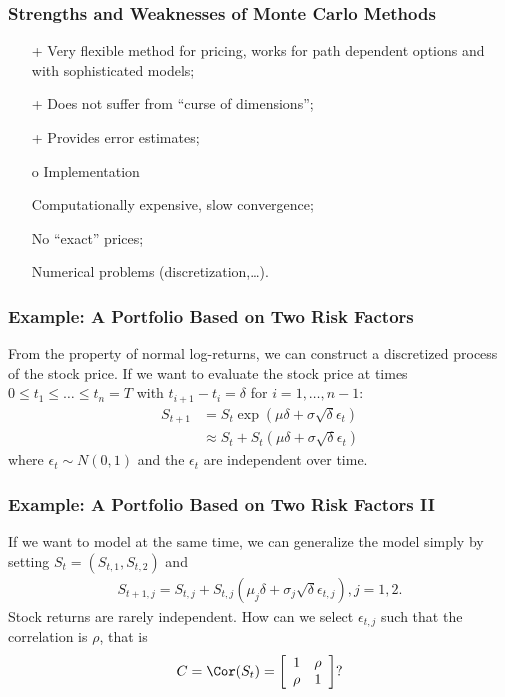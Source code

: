 \begin{frame}[fragile]
\frametitle{Strengths and Weaknesses of Monte Carlo Methods}
\begin{itemize}
  \item[+] Very flexible method for pricing, works for path dependent options
  and with sophisticated models;
  \item[+] Does not suffer from ``curse of dimensions'';
  \item[+] Provides error estimates;
  \item[o\hspace{1px}] Implementation
  \item[\textendash\hspace{1px}] Computationally expensive, slow convergence;
  \item[\textendash\hspace{1px}] No ``exact'' prices;
  \item[\textendash\hspace{1px}] Numerical problems (discretization,\ldots).
\end{itemize}
\end{frame}







\begin{frame}[fragile]
\frametitle{Example: A Portfolio Based on Two Risk Factors}
From the property of normal log-returns, we can construct a discretized process
of the stock price. If we want to evaluate the stock price at times $0 \leq t_1
\leq \ldots \leq t_n=T$ with $t_{i+1}-t_i=\delta$ for $i=1,\ldots,n-1$:
\begin{align*}
  S_{t+1} &= S_t \exp\left( \mu \delta + \sigma \sqrt{\delta} \epsilon_t
  \right)\\
  &\approx S_{t} + S_{t} \left( \mu \delta + \sigma
  \sqrt{\delta} \epsilon_{t} \right)
\end{align*}
where $\epsilon_t\sim N(0,1)$ and the $\epsilon_t$ are independent over time.
\end{frame}

\begin{frame}[fragile]
\frametitle{Example: A Portfolio Based on Two Risk Factors II}
If we want to model at the same time, we can generalize the model simply by
setting $S_{t}=(S_{t,1},S_{t,2})$ and
\begin{align*}
  S_{t+1,j} = S_{t,j} + S_{t,j} \left( \mu_j \delta + \sigma_j
  \sqrt{\delta} \epsilon_{t,j} \right), j=1,2.
\end{align*}
Stock returns are rarely independent. How can we select $\epsilon_{t,j}$ such
that the correlation is $\rho$, that is
\begin{align*}
  C= \Cor(S_{t}) = \left[ \begin{array}{cc}1 & \rho \\ \rho &1
  \end{array}\right] ?
\end{align*}
\end{frame}

